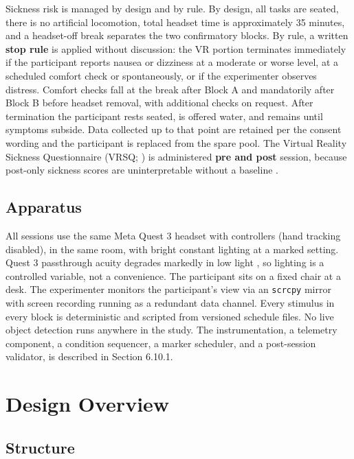 Sickness risk is managed by design and by rule. By design, all tasks are seated, there is no
artificial locomotion, total headset time is approximately 35 minutes, and a headset-off break
separates the two confirmatory blocks. By rule, a written \textbf{stop rule} is applied without
discussion: the VR portion terminates immediately if the participant reports nausea or dizziness at a
moderate or worse level, at a scheduled comfort check or spontaneously, or if the experimenter
observes distress. Comfort checks fall at the break after Block A and mandatorily after Block B
before headset removal, with additional checks on request. After termination the participant rests
seated, is offered water, and remains until symptoms subside. Data collected up to that point are
retained per the consent wording and the participant is replaced from the spare pool. The Virtual
Reality Sickness Questionnaire (VRSQ; \citealp{kim2018}) is administered \textbf{pre and post} session,
because post-only sickness scores are uninterpretable without a baseline \citep{brown2022}.

\subsection{Apparatus}

All sessions use the same Meta Quest 3 headset with controllers (hand tracking disabled), in the same
room, with bright constant lighting at a marked setting. Quest 3 passthrough acuity degrades
markedly in low light \citep{wang2026}, so lighting is a controlled variable, not a convenience.
The participant sits on a fixed chair at a desk. The experimenter monitors the participant's view via
an \verb|scrcpy| mirror with screen recording running as a redundant data channel. Every stimulus in
every block is deterministic and scripted from versioned schedule files. No live object detection
runs anywhere in the study. The instrumentation, a telemetry component, a condition sequencer, a
marker scheduler, and a post-session validator, is described in Section 6.10.1.

\section{Design Overview}

\subsection{Structure}

